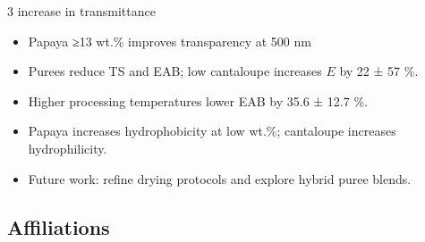 \documentclass[
]{ImperialPoster}
\begin{document}
\begin{multicols}{3}
	 increase in transmittance %
	  \begin{itemize}
      \item Papaya ≥13 wt.\% improves transparency at 500 nm
      \item Purees reduce TS and EAB; low cantaloupe increases $E$ by 22 ± 57 \%.
      \item Higher processing temperatures lower EAB by 35.6 ± 12.7 \%.
      \item Papaya increases hydrophobicity at low wt.\%; cantaloupe increases hydrophilicity.
      \item \textcolor{ICLBlue}{ Future work: refine drying protocols and explore hybrid puree blends.}
    \end{itemize}
  
	
	
	\subsection{Affiliations}
	
	\\

\end{multicols}
\end{document}
